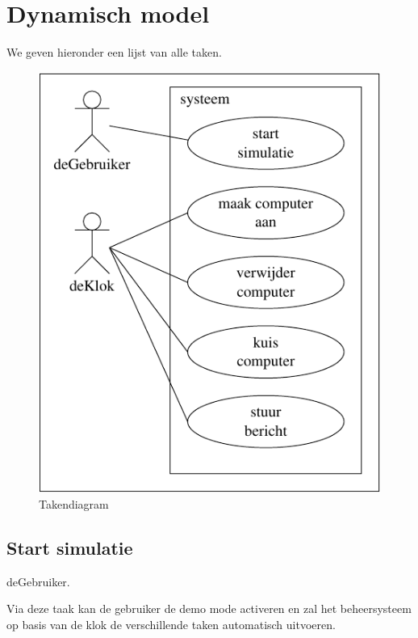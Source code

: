 \documentclass[a4paper,oneside]{report}
\begin{document}
\eindlemma
{}
\newpage
{}
\newpage
\section{Dynamisch model}
We geven hieronder een lijst van alle taken.

\begin{figure}[h!]
\begin{center}

\includegraphics[scale=0.75]{taken_diagram2}

\caption{Takendiagram}
\end{center}
\end{figure}


\subsection{Start simulatie}
deGebruiker.

Via deze taak kan de gebruiker de demo mode activeren en zal het beheersysteem op basis van de klok de verschillende taken automatisch uitvoeren.
\end{document}
